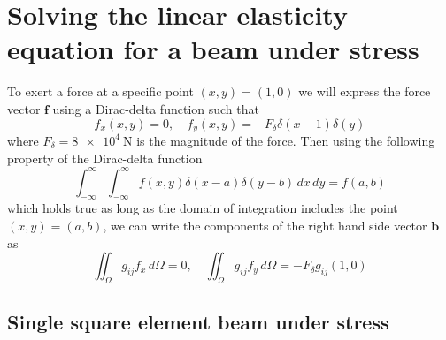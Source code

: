 \documentclass[11pt]{article}
\begin{document}
\section{Solving the linear elasticity equation for a beam under stress}
To exert a force at a specific point $(x,y) = (1,0)$ we will express the force vector $\bm{f}$ using a Dirac-delta function such that
\begin{equation}
  f_x(x,y) = 0, \quad f_y(x,y) = -F_\delta \delta(x-1)\delta(y)
\end{equation}
where $F_\delta = \SI{8e4}{\N}$ is the magnitude of the force. Then using the following property of the Dirac-delta function
\begin{equation}
  \int_{-\infty}^{\infty} \int_{-\infty}^{\infty} f(x,y) \delta(x-a) \delta(y-b) \, dx \, dy = f(a,b)
\end{equation}
which holds true as long as the domain of integration includes the point $(x,y) = (a,b)$, we can write the components of the right hand side vector $\bm{b}$ as
\begin{equation}
  \iint_\Omega g_{ij} f_x \, d\Omega = 0, \quad 
  \iint_\Omega g_{ij} f_y \, d\Omega = -F_\delta g_{ij}(1,0)
\end{equation}

\subsection{Single square element beam under stress}
\end{document}
